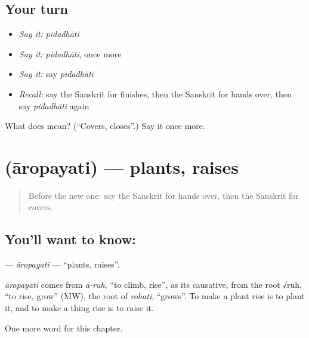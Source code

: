 \subsection*{Your turn}
\begin{itemize}
\raggedright
  \item \emph{Say it:} \emph{pidadhāti}
  \item \emph{Say it:} \emph{pidadhāti}, once more
  \item \emph{Say it:} say \emph{pidadhāti}
  \item \emph{Recall:} say the Sanskrit for finishes, then the Sanskrit for hands over, then say \emph{pidadhāti} again
\end{itemize}

\begin{tcolorbox}[breakable,colback=teal!4,colframe=teal!35!black,title={Before you move on}]
What does  mean? (\textquotedblleft{}Covers, closes\textquotedblright{}.) Say it once more.
\end{tcolorbox}
\section[\texorpdfstring{\sk{आरोपयति} (āropayati)}{आरोपयति (āropayati)}]{ (āropayati) — plants, raises}

\label{lesson:SA-C235-aropayati}



\begin{quote}
Before the new one: say the Sanskrit for hands over, then the Sanskrit for covers.
\end{quote}

\subsection*{You'll want to know: }
\textbf{} — \emph{āropayati} — \textquotedblleft{}plants, raises\textquotedblright{}.

\begin{cousinweb}
\emph{āropayati} comes from \emph{ā-ruh}, \textquotedblleft{}to climb, rise\textquotedblright{}, as its causative, from the root √ruh, \textquotedblleft{}to rise, grow\textquotedblright{} (MW), the root of \emph{rohati}, \textquotedblleft{}grows\textquotedblright{}. To make a plant rise is to plant it, and to make a thing rise is to raise it.
\end{cousinweb}

\begin{grammarlens}[title={What you've built}]
One more word for this chapter.
\end{grammarlens}

